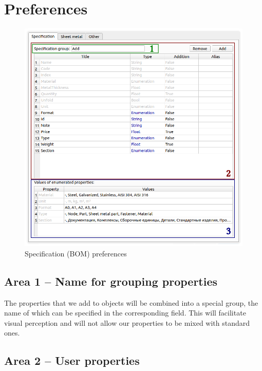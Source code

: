\documentclass[a4paper,12pt]{article}
\begin{document}
\pagebreak




\section{Preferences}

\begin{figure}[htp]
	\centering
	\includegraphics[width=1.0\textwidth]{img/pref_specification.png}
	\caption{Specification (BOM) preferences}
	\label{sec:pref_specification}
\end{figure}

\subsection{Area 1 -- Name for grouping properties}
The properties that we add to objects will be combined into a special group, the name of which can be specified in the corresponding field. This will facilitate visual perception and will not allow our properties to be mixed with standard ones.

\pagebreak

\subsection{Area 2 -- User properties}
\end{document}
